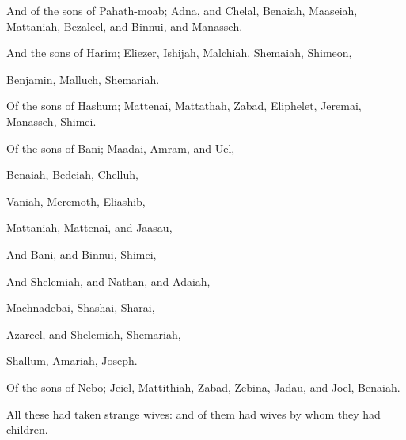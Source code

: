 {And of the
sons of
Pahath-moab;
Adna, and
Chelal,
Benaiah,
Maaseiah,
Mattaniah,
Bezaleel, and
Binnui, and
Manasseh.

And
{} the
sons of
Harim;
Eliezer,
Ishijah,
Malchiah,
Shemaiah,
Shimeon,

Benjamin,
Malluch,
{}
Shemariah.

Of the
sons of
Hashum;
Mattenai,
Mattathah,
Zabad,
Eliphelet,
Jeremai,
Manasseh,
{}
Shimei.

Of the
sons of
Bani;
Maadai,
Amram, and
Uel,

Benaiah,
Bedeiah,
Chelluh,

Vaniah,
Meremoth,
Eliashib,

Mattaniah,
Mattenai, and
Jaasau,

And
Bani, and
Binnui,
Shimei,

And
Shelemiah, and
Nathan, and
Adaiah,

Machnadebai,
Shashai,
Sharai,

Azareel, and
Shelemiah,
Shemariah,

Shallum,
Amariah,
{}
Joseph.

Of the
sons of
Nebo;
Jeiel,
Mattithiah,
Zabad,
Zebina,
Jadau, and
Joel,
Benaiah.

All these had
taken
strange
wives: and
{} of them
had
wives by whom they
had
children.


\par }
